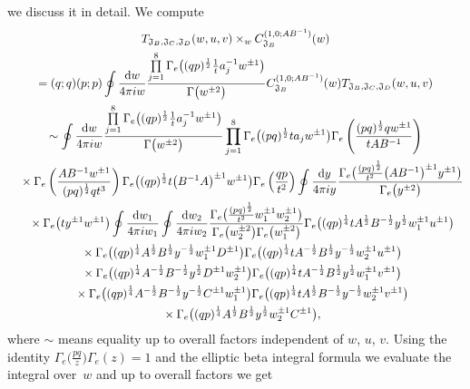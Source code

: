 \documentclass[a4paper,12pt]{article}
\begin{document}
we discuss it in detail. We compute
\begin{gather*}
T_{{\mathfrak J}_B, {\mathfrak J}_C,{\mathfrak J}_D}(w,u,v)\times_w C^{(1,0;AB^{-1})}_{{\mathfrak J}_B}(w)\\
=(q;q)(p;p)\oint\frac{{\rm d}w}{4\pi i w} \frac{\prod\limits_{j=1}^8\Gamma_e\big((q p)^{\frac12 }\frac1t a_j^{-1} w^{\pm1}\big)}{\Gamma\big(w^{\pm2}\big)} C^{(1,0;AB^{-1})}_{{\mathfrak J}_B}(w)T_{{\mathfrak J}_B,{\mathfrak J}_C,{\mathfrak J}_D}(w,u,v) \\
\sim\oint\frac{{\rm d}w}{4\pi i w} \frac{\prod\limits_{j=1}^8\Gamma_e\big((q p)^{\frac12 }\frac1t a_j^{-1} w^{\pm1}\big)}{\Gamma\big(w^{\pm2}\big)}
\prod_{j=1}^8\Gamma_e\big((pq)^{\frac{1}{2}}ta_jw^{\pm1}\big)
\Gamma_e\left(\frac{(pq)^\frac12 q w^{\pm1}}{tAB^{-1}}\right)\\
\quad{} \times\Gamma_e\left(\frac{AB^{-1}w^{\pm1}}{(pq)^{\frac{1}{2}} q t^3}\right)
 \Gamma_e\big((q p)^{\frac12} t\big(B^{-1}A\big)^{\pm1} w^{\pm1}\big)\Gamma_e\left(\frac{q p}{t^2}\right)
\oint \frac{{\rm d}y}{4\pi i y} \frac{\Gamma_e\big(\frac{(p q)^{\frac12}}{t^2}\big(A B^{-1}\big)^{\pm1}y^{\pm1}\big)}{\Gamma_e\big(y^{\pm2}\big)}\\
\quad{}\times\Gamma_e\big(t y^{\pm1} w^{\pm1}\big)\oint\frac{{\rm d}w_1}{4\pi i w_1}\oint \frac{{\rm d}w_2}{4\pi i w_2} \frac{\Gamma_e\big(\frac{(p q)^{\frac12}}{t^2}w_1^{\pm1}w_2^{\pm1}\big)}{\Gamma_e\big(w_2^{\pm2}\big)\Gamma_e\big(w_1^{\pm2}\big)} \Gamma_e\big( (q p)^{\frac14}t A^{\frac12}B^{-\frac12}y^{\frac12} w_1^{\pm1}u^{\pm1}\big)\\
\quad{}\times\Gamma_e\big((qp)^{\frac14} A^{\frac12} B^{\frac12}y^{-\frac12} w_1^{\pm1}D^{\pm1}\big)\Gamma_e\big((q p)^{\frac14} t A^{-\frac12} B^{\frac12} y^{-\frac12} w_2^{\pm1} u^{\pm1}\big)\\
\quad{} \times \Gamma_e \big((q p)^{\frac14} A^{-\frac12} B^{-\frac12} y^{\frac12} D^{\pm1}w_2^{\pm1}\big)\Gamma_e\big((q p)^{\frac14} t A^{-\frac12} B^\frac12 y^\frac12 w_1^{\pm1} v^{\pm1}\big)\\
\quad{} \times \Gamma_e\big( ( q p)^{\frac14} A^{-\frac12} B^{-\frac12} y^{-\frac12} C^{\pm1} w_1^{\pm1}\big) \Gamma_e\big( ( q p )^{\frac14} t A^{\frac12} B^{-\frac12} y^{-\frac12} w_2^{\pm1} v^{\pm1}\big)\\
\quad{}\times\Gamma_e\big( ( q p )^{\frac14} A^{\frac12} B^\frac12 y^\frac12 w_2^{\pm1} C^{\pm1}\big),
\end{gather*}
where $\sim$ means equality up to overall factors independent of $w$, $u$, $v$. Using the identity $\Gamma_e\big(\frac{pq}{z}\big)\Gamma_e(z)=1$ and the elliptic beta integral formula we evaluate the integral over~$w$ and up to overall factors we get
\end{document}

